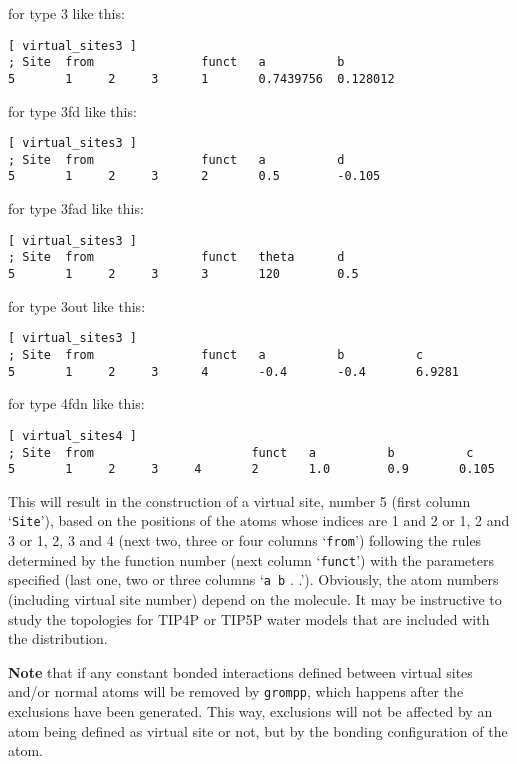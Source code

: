 for type 3 like this:
{\small
\begin{verbatim}
[ virtual_sites3 ]
; Site  from               funct   a          b
5       1     2     3      1       0.7439756  0.128012
\end{verbatim}}

for type 3fd like this:
{\small
\begin{verbatim}
[ virtual_sites3 ]
; Site  from               funct   a          d
5       1     2     3      2       0.5        -0.105
\end{verbatim}}

for type 3fad like this:
{\small
\begin{verbatim}
[ virtual_sites3 ]
; Site  from               funct   theta      d
5       1     2     3      3       120        0.5
\end{verbatim}}

for type 3out like this:
{\small
\begin{verbatim}
[ virtual_sites3 ]
; Site  from               funct   a          b          c
5       1     2     3      4       -0.4       -0.4       6.9281
\end{verbatim}}

for type 4fdn like this:
{\small
\begin{verbatim}
[ virtual_sites4 ]
; Site  from                      funct   a          b          c
5       1     2     3     4       2       1.0        0.9       0.105
\end{verbatim}}

This will result in the construction of a virtual site, number 5
(first column `{\tt Site}'), based on the positions of the atoms
whose indices are 1 and 2 or 1, 2 and 3 or 1, 2, 3 and 4 (next two,
three or four columns `{\tt from}') following the rules determined by the function number
(next column `{\tt funct}') with the parameters specified (last one,
two or three columns `{\tt a b} . .'). Obviously, the atom numbers
(including virtual site number) depend
on the molecule. It may be instructive to study the topologies for
TIP4P or TIP5P water models that are included with the {\gromacs} distribution.

{\bf Note} that if any constant bonded interactions defined between
virtual sites and/or normal atoms will be removed by {\tt grompp},
which happens after the exclusions have been generated.
This way, exclusions will not be affected by an atom being
defined as virtual site or not, but by the bonding configuration of the
atom.

